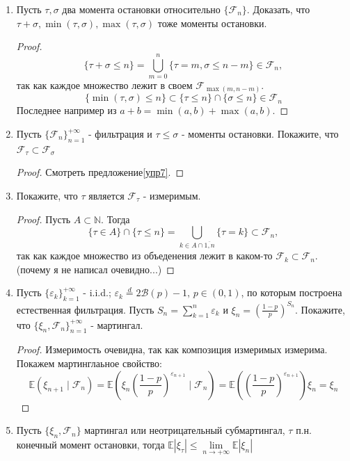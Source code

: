 \documentclass[12pt,a4paper]{article} %
\newcommand{\E}{\mathbb{E}}
\newcommand{\F}{\mathcal{F}}
\newcommand{\M}{\mathfrak{M}}
\begin{document}
\begin{enumerate}
		\begin{proof}
			Известно, что $\E(\eta\mid\M)$ это ортогональный проектор в пространстве $L^2$, тогда из условий на величины получаем:
			$$\eta-\xi\perp\xi\Rightarrow0=\E(\eta-\xi)\xi$$
			$$\E(\xi-\eta)^2=2\E\xi^2-2\E\xi\eta=0$$
		\end{proof}
		\item Пусть $\tau,\sigma$ два момента остановки относительно $\{\F_n\}$. Доказать, что $\tau+\sigma,\min(\tau,\sigma),\max(\tau,\sigma)$ тоже моменты остановки.
		\begin{proof}
			$$\{\tau+\sigma\leq n\}=\bigcup_{m=0}^n\{\tau=m,\sigma\leq n-m\}\in\F_n,$$
			так как каждое множество лежит в своем $\F_{\max(m,n-m)}$.
			$$\{\min(\tau,\sigma)\leq n\}\subset\{\tau\leq n\}\cap\{\sigma\leq n\}\in\F_n$$
			Последнее например из $a+b=\min(a,b)+\max(a,b)$.
		\end{proof}
		\item Пусть $\{\F_n\}_{n=1}^{+\infty}$ - фильтрация и $\tau\leq\sigma$ - моменты остановки. Покажите, что $\F_{\tau}\subset\F_{\sigma}$
		\begin{proof}
			Смотреть предложение\eqref{упр7}.
		\end{proof}
		\item Покажите, что $\tau$ является $\F_{\tau}$ - измеримым.
		\begin{proof}
			Пусть $A\subset\mathbb{N}$. Тогда 
			$$\{\tau\in A\}\cap\{\tau\leq n\}=\bigcup_{k\in A\cap\overline{1,n}}\{\tau=k\}\subset\F_n,$$
			так как каждое множество из объеденения лежит в каком-то $\F_k\subset\F_n$. (почему я не написал очевидно...)
		\end{proof}
		\item Пусть $\{\varepsilon_k\}_{k=1}^{+\infty}$ - i.i.d.; $\varepsilon_k\overset{d}{=}2\mathcal{B}(p)-1,\,p\in(0,1)$, по которым построена естественная фильтрация. Пусть $S_n=\displaystyle\sum_{k=1}^n\varepsilon_k$ и $\xi_n=\left(\frac{1-p}{p}\right)^{S_n}$. Покажите, что $\{\xi_n,\F_n\}_{n=1}^{+\infty}$ - мартингал.
		\begin{proof}
			Измеримость очевидна, так как композиция измеримых измерима. Покажем мартинглаьное свойство:
			$$\E(\xi_{n+1}\mid\F_n)=\E\left(\xi_n\left(\frac{1-p}{p}\right)^{\varepsilon_{n+1}}\mid\F_n\right)=\E\left(\left(\frac{1-p}{p}\right)^{\varepsilon_{n+1}}\right)\xi_n=\xi_n$$
		\end{proof}
		\item Пусть $\{\xi_n,\F_n\}$ мартингал или неотрицательный субмартингал, $\tau$ п.н. конечный момент остановки, тогда $\E|\xi_{\tau}|\leq\lim\limits_{n\rightarrow+\infty}\E|\xi_n|$

\end{enumerate}
\end{document}
